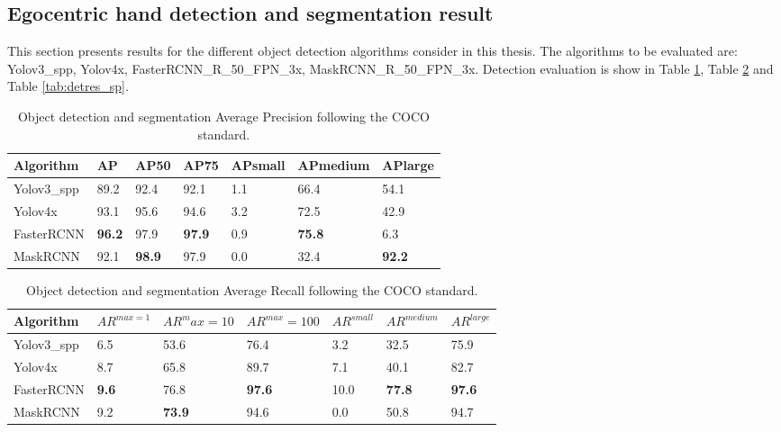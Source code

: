 \subsection{Egocentric hand detection and segmentation result}
This section presents results for the different object detection algorithms consider in this thesis. The algorithms to be evaluated are: Yolov3\_spp, Yolov4x, FasterRCNN\_R\_50\_FPN\_3x, MaskRCNN\_R\_50\_FPN\_3x. Detection evaluation is show in Table \ref{tab:detres_ap}, Table \ref{tab:detres_ar} and Table \ref{tab:detres_sp}.
\begin{table}[]
	\label{tab:detres_ap}
	\begin{tabular}{|l|l|l|l|l|l|l|}
		\hline
		Algorithm                  & AP            & AP50          & AP75          & APsmall & APmedium      & APlarge       \\ \hline
		Yolov3\_spp                & 89.2          & 92.4          & 92.1          & 1.1     & 66.4          & 54.1          \\ \hline
		Yolov4x                    & 93.1          & 95.6          & 94.6          & 3.2     & 72.5          & 42.9          \\ \hline
		FasterRCNN & \textbf{96.2} & 97.9          & \textbf{97.9} & 0.9     & \textbf{75.8} & 6.3           \\ \hline
		MaskRCNN  & 92.1          & \textbf{98.9} & 97.9          & 0.0     & 32.4          & \textbf{92.2} \\ \hline
	\end{tabular}
	\caption{Object detection and segmentation Average Precision following the COCO standard.}
\end{table}
	
\begin{table}[]
	
	\begin{tabular}{|l|l|l|l|l|l|l|}
		\hline
		Algorithm                  & \(AR^{max=1}\)      & \(AR^max=10\)      & \(AR^{max}=100\)     & \(AR^{small}\) & \(AR^{medium}\)      & \(AR^{large}\)       \\ \hline
		Yolov3\_spp                & 6.5          & 53.6          & 76.4          & 3.2     & 32.5          & 75.9          \\ \hline
		Yolov4x                    & 8.7          & 65.8          & 89.7          & 7.1     & 40.1          & 82.7          \\ \hline
		FasterRCNN & \textbf{9.6} & 76.8          & \textbf{97.6} & 10.0    & \textbf{77.8} & \textbf{97.6} \\ \hline
		MaskRCNN   & 9.2          & \textbf{73.9} & 94.6          & 0.0     & 50.8          & 94.7          \\ \hline
	\end{tabular}
	\label{tab:detres_ar}
	\caption{Object detection and segmentation Average Recall following the COCO standard.}
\end{table}

